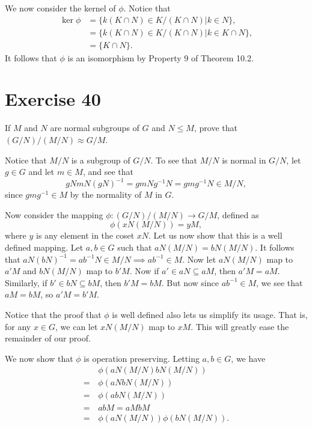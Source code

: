 \documentclass[12pt]{article}
\begin{document}
We now consider the kernel of $\phi$.  Notice that
\begin{align*}
\ker\phi &= \{k(K\cap N)\in K/(K\cap N)|k\in N\}, \\
 &= \{k(K\cap N)\in K/(K\cap N)|k\in K\cap N\}, \\
 &= \{K\cap N\}.
\end{align*}
It follows that $\phi$ is an isomorphism by Property 9
of Theorem 10.2.

\section*{Exercise 40}

If $M$ and $N$ are normal subgroups of $G$ and $N\leq M$, prove
that $(G/N)/(M/N)\approx G/M$.

Notice that $M/N$ is a subgroup of $G/N$.  To see that $M/N$ is normal in $G/N$,
let $g\in G$ and let $m\in M$, and see that
\begin{equation*}
gNmN(gN)^{-1}=gmNg^{-1}N=gmg^{-1}N\in M/N,
\end{equation*}
since $gmg^{-1}\in M$ by the normality of $M$ in $G$.

Now consider the mapping $\phi:(G/N)/(M/N)\to G/M$, defined as
\begin{equation*}
\phi(xN(M/N))=yM,
\end{equation*}
where $y$ is any element in the coset $xN$.  Let us now show that
this is a well defined mapping.  Let $a,b\in G$ such that
$aN(M/N)=bN(M/N)$.  It follows that $aN(bN)^{-1}=ab^{-1}N\in M/N\implies ab^{-1}\in M$.
Now let $aN(M/N)$ map to $a'M$ and $bN(M/N)$ map to $b'M$.
Now if $a'\in aN\subseteq aM$, then $a'M=aM$.
Similarly, if $b'\in bN\subseteq bM$, then $b'M=bM$.
But now since $ab^{-1}\in M$, we see that $aM=bM$, so $a'M=b'M$.

Notice that the proof that $\phi$ is well defined also lets us simplify its usage.
That is, for any $x\in G$, we can let $xN(M/N)$ map to $xM$.  This will greatly
ease the remainder of our proof.

We now show that $\phi$ is operation preserving.  Letting $a,b\in G$, we have
\begin{align*}
 & \phi(aN(M/N)bN(M/N)) \\
 =\,& \phi(aNbN(M/N)) \\
 =\,& \phi(abN(M/N)) \\
 =\,& abM = aMbM \\
 =\,& \phi(aN(M/N))\phi(bN(M/N)).
\end{align*}
\end{document}
